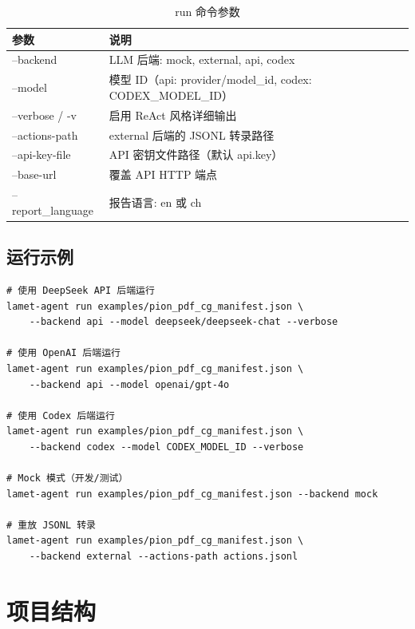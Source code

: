 \documentclass[12pt,a4paper]{ctexart}
\begin{document}
\begin{table}[h]
\centering
\begin{tabular}{@{}>{\ttfamily}ll@{}}
\toprule
\textbf{参数} & \textbf{说明} \\
\midrule
--backend & LLM 后端: mock, external, api, codex \\
--model   & 模型 ID（api: provider/model\_id, codex: CODEX\_MODEL\_ID）\\
--verbose / -v & 启用 ReAct 风格详细输出 \\
--actions-path & external 后端的 JSONL 转录路径 \\
--api-key-file & API 密钥文件路径（默认 api.key）\\
--base-url & 覆盖 API HTTP 端点 \\
--report\_language & 报告语言: en 或 ch \\
\bottomrule
\end{tabular}
\caption{run 命令参数}
\end{table}

\subsection{运行示例}

\begin{lstlisting}[style=bashcode]
# 使用 DeepSeek API 后端运行
lamet-agent run examples/pion_pdf_cg_manifest.json \
    --backend api --model deepseek/deepseek-chat --verbose

# 使用 OpenAI 后端运行
lamet-agent run examples/pion_pdf_cg_manifest.json \
    --backend api --model openai/gpt-4o

# 使用 Codex 后端运行
lamet-agent run examples/pion_pdf_cg_manifest.json \
    --backend codex --model CODEX_MODEL_ID --verbose

# Mock 模式（开发/测试）
lamet-agent run examples/pion_pdf_cg_manifest.json --backend mock

# 重放 JSONL 转录
lamet-agent run examples/pion_pdf_cg_manifest.json \
    --backend external --actions-path actions.jsonl
\end{lstlisting}

\section{项目结构}
\end{document}
